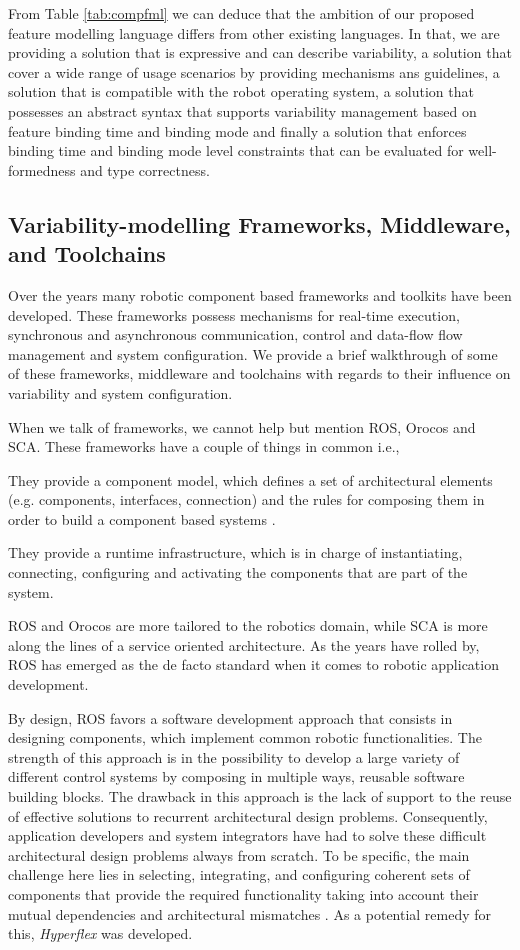 \documentclass[conference]{IEEEtran}
\begin{document}
From Table \ref{tab:compfml} we can deduce that the ambition of our proposed feature modelling language differs from other existing languages. In that, we are providing a solution that is expressive and can describe variability, a solution that cover a wide range of usage scenarios by providing mechanisms ans guidelines, a solution that is compatible with the robot operating system, a solution that possesses an abstract syntax that supports variability management based on feature binding time and binding mode and finally a solution that enforces binding time and binding mode level constraints that can be evaluated for well-formedness and type correctness.

\subsection{Variability-modelling Frameworks, Middleware, and Toolchains}
Over the years many robotic component based frameworks and toolkits
have been developed. These frameworks possess mechanisms for real-time execution, synchronous and asynchronous communication, control and data-flow flow management and system configuration. We provide a brief walkthrough of some of these frameworks, middleware and toolchains with regards to their influence on variability and system configuration.

When we talk of frameworks, we cannot help but mention ROS, Orocos and SCA. These frameworks have a  couple of things in common i.e., \begin{enumerate*}[label=(\roman*)]
	\item They provide a component model, which defines a set of architectural
elements (e.g. components, interfaces, connection) and the rules for
composing them in order to build a component based systems \cite{lgherardi}.
	\item They provide a runtime infrastructure, which is in charge of instantiating, connecting, configuring and activating the components that are part of the system.
\end{enumerate*} 
ROS and Orocos are more tailored to the robotics domain, while SCA is more along the lines of a service oriented architecture. As the years have rolled by, ROS has emerged as the de facto standard when it comes to robotic application development.

By design, ROS favors a software development approach that consists in designing components, which implement common robotic functionalities. The strength of this approach is in the possibility to develop a large variety of different control systems by composing in multiple ways, reusable software building blocks. The drawback in this approach is the lack of support to the
reuse of effective solutions to recurrent architectural design problems. Consequently, application developers and system integrators have had to solve these difficult architectural design problems always from scratch. To be specific, the main challenge here lies in selecting, integrating, and configuring coherent sets of components that provide the required functionality taking into account their mutual dependencies and architectural mismatches \cite{ros-ref}. As a potential remedy for this, \textit{Hyperflex} was developed.
\end{document}
